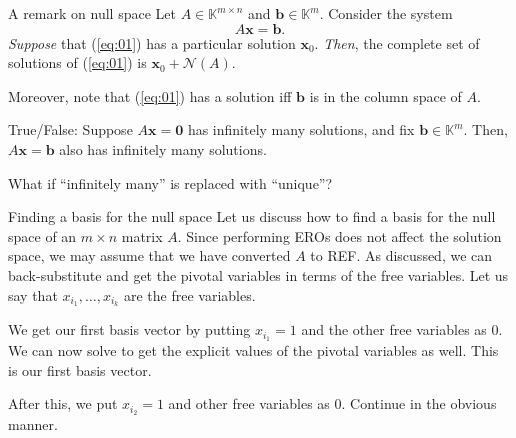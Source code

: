 \documentclass[dvipsnames]{beamer}
\theoremstyle{definition}
\begin{document}
\begin{frame}{A remark on null space}
    Let $A \in \mathbb{K}^{m \times n}$ and $\mathbf{b} \in \mathbb{K}^{m}$. Consider the system
    \begin{equation} \label{eq:01} \tag{$\ast$}
        A \mathbf{x} = \mathbf{b}.
    \end{equation} \pause
    \emph{Suppose} that (\ref{eq:01}) has a particular solution $\mathbf{x}_{0}$. \pause \emph{Then}, the complete set of solutions of (\ref{eq:01}) is $\mathbf{x}_{0} + \mathcal{N}(A)$. \pause

    Moreover, note that (\ref{eq:01}) has a solution iff $\mathbf{b}$ is in the column space of $A$. \pause

    True/False: Suppose $A \mathbf{x} = \mathbf{0}$ has infinitely many solutions, and fix $\mathbf{b} \in \mathbb{K}^{m}$. Then, $A \mathbf{x} = \mathbf{b}$ also has infinitely many solutions. \pause

    What if ``infinitely many'' is replaced with ``unique''?
\end{frame}
\begin{frame}{Finding a basis for the null space}
    Let us discuss how to find a basis for the null space of an $m \times n$ matrix $A$. \pause Since performing EROs does not affect the solution space, we may assume that we have converted $A$ to REF. \pause As discussed, we can back-substitute and get the pivotal variables in terms of the free variables. \pause Let us say that $x_{i_{1}}, \ldots, x_{i_{k}}$ are the free variables. \pause

    We get our first basis vector by putting $x_{i_{1}} = 1$ and the other free variables as $0$. \pause We can now solve to get the explicit values of the pivotal variables as well. \pause This is our first basis vector. \pause

    After this, we put $x_{i_{2}} = 1$ and other free variables as $0$. \pause Continue in the obvious manner.
\end{frame}
\end{document}
